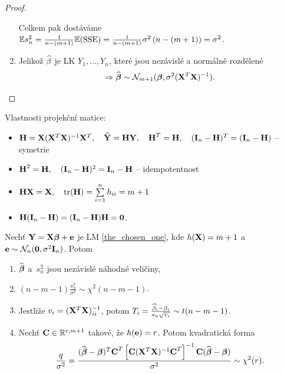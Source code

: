 \begin{proof}
\begin{enumerate}
Celkem pak dostáváme $\mathbb{E} s_n^2 = \frac{1}{n - (m + 1)} \mathbb{E} (\mathrm{SSE}) = \frac{1}{n - (m + 1)} \sigma^2\left(n - (m + 1)\right) = \sigma^2$.

\item
 Jelikož $\widehat{\beta}$ je LK $Y_1,\dots, Y_n$, které jsou nezávislé a normálně rozdělené $$\Rightarrow \widehat{\boldsymbol{\beta}} \sim \mathcal{N}_{m+1} (\boldsymbol{\beta}, \sigma^2(\mathbf{X}^T \mathbf{X})^{-1}).$$
\end{enumerate}
\end{proof}

\begin{remark}
	Vlastnosti projekční matice:
	\begin{itemize}
		\item $\textbf{H} = \mathbf{X} (\mathbf{X}^T \mathbf{X})^{-1} \mathbf{X}^T, \quad \widehat{\mathbf{Y}} = \textbf{H} \mathbf{Y}, \quad \textbf{H}^T = \textbf{H}, \quad (\textbf{I}_{n} - \textbf{H})^T = (\textbf{I}_{n} - \textbf{H})$ -- symetrie
		\item $\textbf{H}^2 = \textbf{H}, \quad (\textbf{I}_{n} - \textbf{H})^2 = \textbf{I}_{n} - \textbf{H}$ -- idempotentnost
		\item $\textbf{H} \mathbf{X} = \mathbf{X}, \quad \mathrm{tr}(\textbf{H}) = \sum\limits_{i=1}^{n} h_{ii} = m + 1$
		\item $\textbf{H}(\textbf{I}_{n} - \textbf{H}) = (\textbf{I}_{n} - \textbf{H}) \textbf{H} = \boldsymbol{0}$.
	\end{itemize}
\end{remark}

\begin{theorem}
	Nechť $\mathbf{Y} = \mathbf{X} \boldsymbol{\beta} + \mathbf{e}$ je LM \eqref{the_chosen_one}, kde $h(\mathbf{X}) = m + 1$ a~$\mathbf{e} \sim \mathcal{N}_n(\boldsymbol{0},\sigma^2 \textbf{I}_{n})$. Potom
	\begin{enumerate}
		\item $\widehat{\boldsymbol{\beta}}$ a~$s_n^2$ jsou nezávislé náhodné veličiny,
		\item $(n - m - 1) \frac{s_n^2}{\sigma^2} \sim \chi^2(n - m - 1)$.
		\item Jestliže $v_i = (\mathbf{X}^T \mathbf{X})_{ii}^{-1}$, potom $T_i = \frac{\widehat{\beta}_i - \beta_i}{s_n \sqrt{v_i}} \sim t(n-m-1)$.
		\item Nechť $\textbf{C} \in \mathbb{R}^{r,m+1}$ takové, že $h(\mathbf{e}) = r$. Potom kvadratická forma
		 $$
			\frac{q}{\sigma^2} = \frac{(\widehat{\boldsymbol{\beta}} - \boldsymbol{\beta})^T \textbf{C}^T \left[\textbf{C} (\mathbf{X}^T \mathbf{X})^{-1} \textbf{C}^T \right]^{-1} \textbf{C} (\widehat{\boldsymbol{\beta}} - \boldsymbol{\beta})}{\sigma^2} \sim \chi^2(r).
		 $$
	\end{enumerate}
\end{theorem}

